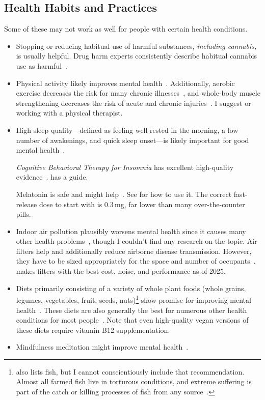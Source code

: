 \documentclass[11pt,oneside]{book}
\let\cite\parencite
\begin{document}
\subsection*{Health Habits and Practices}
Some of these may not work as well for people with certain health conditions.
\begin{itemize}
   \item Stopping or reducing habitual use of harmful substances, \textit{including cannabis,} is usually helpful. Drug harm experts consistently describe habitual cannabis use as harmful~\cite{nuttDrugHarms,bonomoHarms,crossinHarms}.
   \item Physical activity likely improves mental health~\cite{activityMetaAnalysis}. Additionally, aerobic exercise decreases the risk for many chronic illnesses~\cite{liebermanExercised}, and whole-body muscle strengthening decreases the risk of acute and chronic injuries~\cite{lauersenStrength}. I suggest \textcite{lowBodyweight} or working with a physical therapist.
   \item High sleep quality---defined as feeling well-rested in the morning, a low number of awakenings, and quick sleep onset---is likely important for good mental health~\cite{scottSleep}.
   
   \textit{Cognitive Behavioral Therapy for Insomnia} has excellent high-quality evidence~\cite{trauerCBTI}. \textcite{stanfordSleep} has a guide.
   
   Melatonin is safe and might help~\cite{moon2022role}. See \textcite{scottMelatonin} for how to use it. The correct fast-release dose to start with is 0.3\,mg, far lower than many over-the-counter pills.
   \item Indoor air pollution plausibly worsens mental health since it causes many other health problems~\cite{airPollution}, though I couldn't find any research on the topic. Air filters help and additionally reduce airborne disease transmission. However, they have to be sized appropriately for the space and number of occupants~\cite{filterSizing}. \textcite{cleanAir} makes filters with the best cost, noise, and performance as of 2025.
   \item Diets primarily consisting of a variety of whole plant foods (whole grains, legumes, vegetables, fruit, seeds, nuts)\footnote{\textcite{dietMentalHealth} also lists fish, but I cannot conscientiously include that recommendation. Almost all farmed fish live in torturous conditions, and extreme suffering is part of the catch or killing processes of fish from any source~\cite{singerLiberation}.} show promise for improving mental health~\cite{dietMentalHealth}. These diets are also generally the best for numerous other health conditions for most people~\cite{WillettEATLancet}. Note that even high-quality vegan versions of these diets require vitamin B12 supplementation.
   \item Mindfulness meditation might improve mental health~\cite{meditationMentalHealth}.
\end{itemize}
\end{document}

